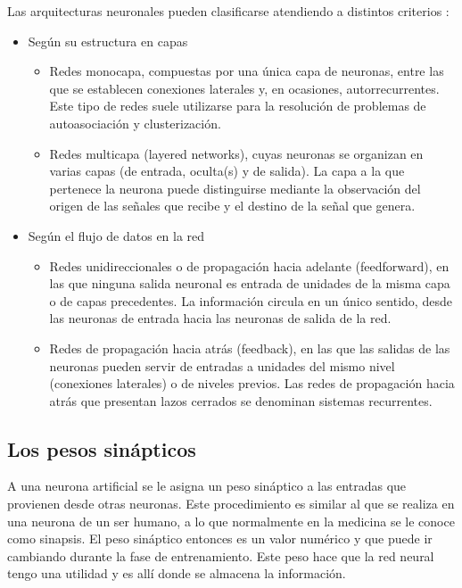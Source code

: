 \vspace{1\baselineskip}
Las arquitecturas neuronales pueden clasificarse atendiendo a distintos criterios \cite{lopez2008redes}:

\begin{itemize}
\item Según su estructura en capas
\begin{itemize}
  \item Redes monocapa, compuestas por una única capa de neuronas, entre las que se establecen conexiones laterales y, en ocasiones, autorrecurrentes. Este tipo de redes suele utilizarse para la resolución de problemas de autoasociación y clusterización.

  \item Redes multicapa (layered networks), cuyas neuronas se organizan en varias capas (de entrada, oculta(s) y de salida). La capa a la que pertenece la neurona puede distinguirse mediante la observación del origen de las señales que recibe y el destino de la señal que genera.
\end{itemize}

\item Según el flujo de datos en la red

\begin{itemize}
  \item Redes unidireccionales o de propagación hacia adelante (feedforward), en las que ninguna salida neuronal es entrada de unidades de la misma capa o de capas precedentes. La información circula en un único sentido, desde las neuronas de entrada hacia las neuronas de salida de la red.

  \item Redes de propagación hacia atrás (feedback), en las que las salidas de las neuronas pueden servir de entradas a unidades del mismo nivel (conexiones laterales) o de niveles previos. Las redes de propagación hacia atrás que presentan lazos cerrados se denominan sistemas recurrentes.
\end{itemize}
\end{itemize}
\subsection{Los pesos sinápticos}
A una neurona artificial se le asigna un peso sináptico a las entradas que provienen desde otras neuronas. Este procedimiento es similar al que se realiza en una neurona de un ser humano, a lo que normalmente en la medicina se le conoce como sinapsis. El peso sináptico entonces es un valor numérico y que puede ir cambiando durante la fase de entrenamiento\cite{acevedo2017principios}. Este peso hace que la red neural tengo una utilidad y es allí donde se almacena la información.

